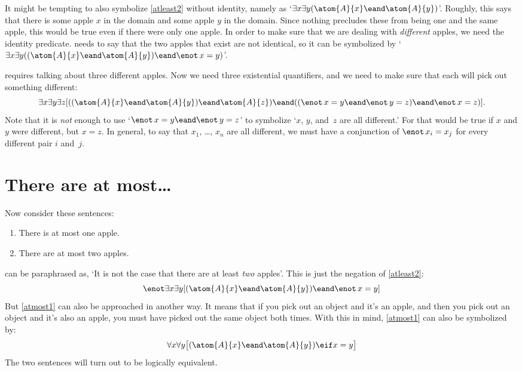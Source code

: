 It might be tempting to also symbolize \cref*{atleast2} without
identity, namely as `$\exists x \exists y(\atom{A}{x} \eand
\atom{A}{y})$'. Roughly, this says that there is some apple $x$ in the
domain and some apple $y$ in the domain. Since nothing precludes these
from being one and the same apple, this would be true even if there
were only one apple. In order to make sure that we are dealing with
\emph{different} apples, we need the identity predicate.
 needs to say that the two apples that exist are not
identical, so it can be symbolized by `$\exists x \exists
y((\atom{A}{x} \eand \atom{A}{y}) \eand \enot\, {x = y})$'.

 requires talking about three different apples. Now we need three existential quantifiers, and we need to make sure that each will pick out something different: 
\[
	\exists x \exists y\exists z[((\atom{A}{x} \eand \atom{A}{y}) \eand \atom{A}{z}) \eand ((\enot\, {x = y} \eand \enot\, {y = z}) \eand \enot\, {x = z})].
\]
Note that it is \emph{not} enough to use `$\enot\, {x = y} \eand \enot\, {y = z}$' to symbolize `$x$, $y$, and~$z$ are all different.' For that would be true if $x$ and $y$ were different, but $x = z$. In general, to say that $x_1$, \dots, $x_n$ are all different, we must have a conjunction of $\enot\, {x_i = x_j}$ for every different pair $i$ and~$j$.

\section{There are at most\ldots}
Now consider these sentences:
\begin{enumerate}
	\item\label{atmost1} There is at most one apple.
	\item\label{atmost2} There are at most two apples.
\end{enumerate}
 can be paraphrased as, `It is not the case that there
are at least \emph{two} apples'. This is just the negation of
\cref{atleast2}: 
\[
	\enot \exists x \exists y[(\atom{A}{x} \eand \atom{A}{y}) \eand \enot\, {x = y}]
\]
But \cref*{atmost1} can also be approached in another way. It means
that if you pick out an object and it's an apple, and then you pick
out an object and it's also an apple, you must have picked out the
same object both times. With this in mind, \cref*{atmost1} can also be
symbolized by:
\[
	\forall x\forall y\bigl[(\atom{A}{x} \eand \atom{A}{y}) \eif x=y\bigr]
\]
The two sentences will turn out to be logically equivalent.

